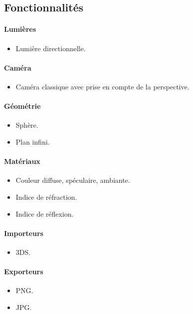 \subsection{Fonctionnalités}
\paragraph{Lumières}
\begin{itemize}
  \item Lumière directionnelle.
\end{itemize}

\paragraph{Caméra}
\begin{itemize}
  \item Caméra classique avec prise en compte de la perspective.
\end{itemize}

\paragraph{Géométrie}
\begin{itemize}
  \item Sphère.
  \item Plan infini.
\end{itemize}

\paragraph{Matériaux}
\begin{itemize}
  \item Couleur diffuse, spéculaire, ambiante.
  \item Indice de réfraction.
  \item Indice de réflexion.
\end{itemize}

\paragraph{Importeurs}
\begin{itemize}
  \item 3DS.
\end{itemize}

\paragraph{Exporteurs}
\begin{itemize}
  \item PNG.
  \item JPG.
\end{itemize}
